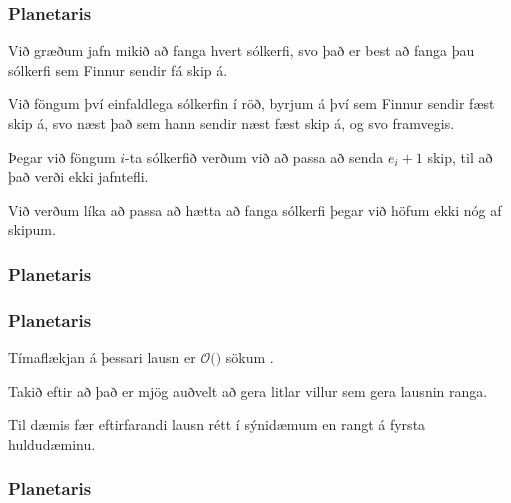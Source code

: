 {
	\frametitle{Planetaris}
	{
		\item<1-> Við græðum jafn mikið að fanga hvert sólkerfi, svo það er best að fanga þau sólkerfi sem Finnur sendir fá skip á.
		\item<2-> Við föngum því einfaldlega sólkerfin í röð, byrjum á því sem Finnur sendir fæst skip á,
					svo næst það sem hann sendir næst fæst skip á, og svo framvegis.
		\item<3-> Þegar við föngum $i$-ta sólkerfið verðum við að passa að senda $e_i + 1$ skip, til að það verði ekki jafntefli.
		\item<4-> Við verðum líka að passa að hætta að fanga sólkerfi þegar við höfum ekki nóg af skipum.
	}
}

{
	\frametitle{Planetaris}
}

{
	\frametitle{Planetaris}
	{
		\item<1-> Tímaflækjan á þessari lausn er $\mathcal{O}($$)$ sökum \onslide<2->{röðunar}.
		\item<3-> Takið eftir að það er mjög auðvelt að gera litlar villur sem gera lausnin ranga.
		\item<4-> Til dæmis fær eftirfarandi lausn rétt í sýnidæmum en rangt á fyrsta huldudæminu.
	}
}

{
	\frametitle{Planetaris}
}

{
}


